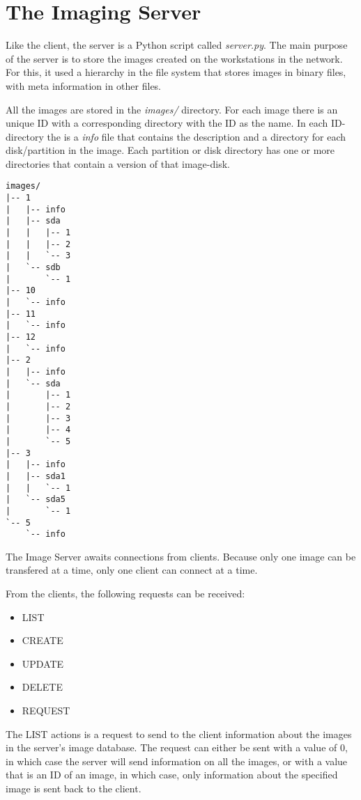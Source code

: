 

\chapter{The Imaging Server}\label{ch:server}

Like the client, the server is a Python script called  \emph{server.py}.
The main purpose of the server is to store the images created on the
workstations in the network. For this, it used a hierarchy in the file
system that stores images in binary files, with meta information in
other files.

All the images are stored in the \emph{images/} directory. For each image
there is an unique ID with a corresponding directory with the ID as the
name. In each ID-directory the is a \emph{info} file that contains the
description and a directory for each disk/partition in the image. Each
partition or disk directory has one or more directories that contain a
version of that image-disk.

\begin{lstlisting}[caption= Images directory hierarchy on the Image Server]
images/
|-- 1
|   |-- info
|   |-- sda
|   |   |-- 1
|   |   |-- 2
|   |   `-- 3
|   `-- sdb
|       `-- 1
|-- 10
|   `-- info
|-- 11
|   `-- info
|-- 12
|   `-- info
|-- 2
|   |-- info
|   `-- sda
|       |-- 1
|       |-- 2
|       |-- 3
|       |-- 4
|       `-- 5
|-- 3
|   |-- info
|   |-- sda1
|   |   `-- 1
|   `-- sda5
|       `-- 1
`-- 5
    `-- info

\end{lstlisting}

The Image Server awaits connections from clients. Because only one image
can be transfered at a time, only one client can connect at a time.

From the clients, the following requests can be received:
\begin{itemize}
\item LIST
\item CREATE
\item UPDATE
\item DELETE
\item REQUEST
\end{itemize}

The LIST actions is a request to send to the client information about the
images in the server's image database. The request can either be sent with
a value of 0, in which case the server will send information on all the
images, or with a value that is an ID of an image, in which case, only
information about the specified image is sent back to the client.

